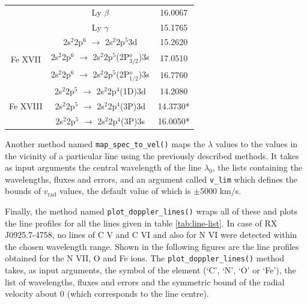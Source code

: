 \begin{table}[h!]
\begin{tabular}{ccc}
                                                  & {Ly $\beta$}  & {16.0067} \\ %
                                                  & {Ly $\gamma$} & {15.1765} \\ \hline
                        \multirow{3}{*}{Fe XVII}  & {2s$^2$2p$^6$ $\longrightarrow$ 2s$^2$2p$^5$3d} & {15.2620} \\ %
                                                  & {2s$^2$2p$^6$ $\longrightarrow$ 2s$^2$2p$^5$(2P$^o_{3/2}$)3s} & {17.0510} \\ %
                                                  & {2s$^2$2p$^6$ $\longrightarrow$ 2s$^2$2p$^5$(2P$^o_{1/2}$)3s} & {16.7760} \\ \hline
                        \multirow{3}{*}{Fe XVIII} & {2s$^2$2p$^5$ $\longrightarrow$ 2s$^2$2p$^4$(1D)3d} & {14.2080} \\ %
                                                  & {2s$^2$2p$^5$ $\longrightarrow$ 2s$^2$2p$^4$(3P)3d} & {14.3730*} \\ %
                                                  & {2s$^2$2p$^5$ $\longrightarrow$ 2s$^2$2p$^4$(3P)3s} & {16.0050*} \\ \hline
                    \end{tabular}
                \end{table}
                
                Another method named \texttt{map\_spec\_to\_vel()} maps the $\lambda$ values to the  values in the vicinity of a particular line using the previously described methods. It takes as input arguments the central wavelength of the line $\lambda_0$, the lists containing the wavelengths, fluxes and errors, and an argument called \texttt{v\_lim} which defines the bounds of $v_\text{rad}$ values, the default value of which is $\pm$5000 km/s.
                
                Finally, the method named \texttt{plot\_doppler\_lines()} wraps all of these and plots the line profiles for all the lines given in table \ref{tab:line-list}. In case of RX J0925.7-4758, no lines of C V and C VI and also for N VI were detected within the chosen wavelength range. Shown in the following figures are the line profiles obtained for the N VII, O and Fe ions. The \texttt{plot\_doppler\_lines()} method takes, as input arguments, the symbol of the element (`C', `N', `O' or `Fe'), the list of wavelengths, fluxes and errors and the symmetric bound of the radial velocity about 0 (which corresponds to the line centre).
                

